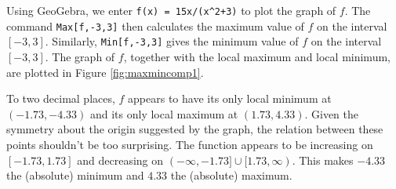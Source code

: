 {
Using GeoGebra, we enter \texttt{f(x) = 15x/(x\string^2+3)} to plot the graph of $f$. The command \texttt{Max[f,-3,3]} then calculates the maximum value of $f$ on the interval $[-3,3]$. Similarly, \texttt{Min[f,-3,3]} gives the minimum value of $f$ on the interval $[-3,3]$. The graph of $f$, together with the local maximum and local minimum, are plotted in Figure \ref{fig:maxmincomp1}.


To two decimal places, $f$ appears to have its only local minimum at $(-1.73, -4.33)$ and its only local maximum at  $(1.73, 4.33)$.  Given the symmetry about the origin suggested by the graph, the relation between these points shouldn't be too surprising.  The function appears to be increasing on $[-1.73, 1.73]$ and decreasing on $(-\infty, -1.73] \cup [1.73,\infty)$.  This makes $-4.33$ the (absolute) minimum and $4.33$ the (absolute) maximum.
}

\medskip

